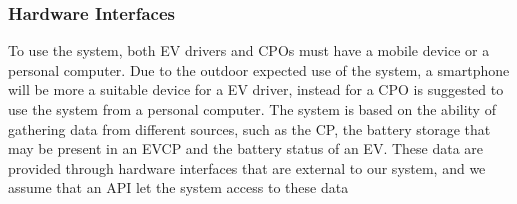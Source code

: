 \begin{figure}[H]
    \centering
    \newline
    \newline
\end{figure}


\subsubsection{Hardware Interfaces}
To use the system, both EV drivers and CPOs must have a mobile device or a personal computer.
Due to the outdoor expected use of the system, a smartphone will be more a suitable device
for a EV driver, instead for a CPO is suggested to use the system from a personal computer.
The system is based on the ability of gathering data from different sources, such as the CP, the battery storage that may be present in an EVCP and the battery status of an EV. These data are provided through hardware interfaces that are external
to our system, and we assume that an API let the system access to these data

